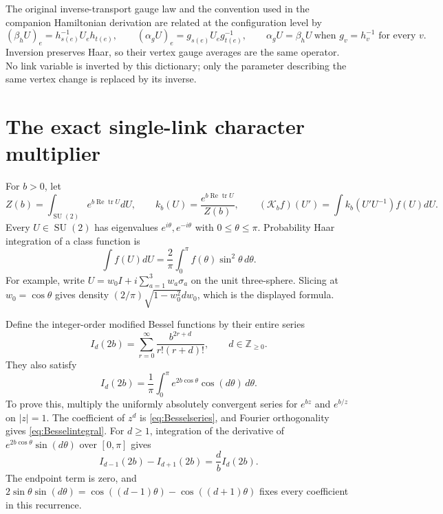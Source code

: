 \documentclass[11pt]{article}
\newcommand{\SU}{\operatorname{SU}}
\newcommand{\tr}{\operatorname{tr}}
\newcommand{\Rea}{\operatorname{Re}}
\begin{document}
The original inverse-transport gauge law and the convention used in the
companion Hamiltonian derivation are related at the configuration level by
\begin{equation}\label{eq:gaugedictionary}
 (\beta_hU)_e=h_{s(e)}^{-1}U_eh_{t(e)},\qquad
 (\alpha_gU)_e=g_{s(e)}U_eg_{t(e)}^{-1},\qquad
 \alpha_gU=\beta_hU\ \text{when }g_v=h_v^{-1}\text{ for every }v.
\end{equation}
Inversion preserves Haar, so their vertex gauge averages are the same
operator. No link variable is inverted by this dictionary; only the
parameter describing the same vertex change is replaced by its inverse.

\section{The exact single-link character multiplier}

For $b>0$, let
\begin{equation}\label{eq:kernel}
 Z(b)=\int_{\SU(2)}e^{b\Rea\tr U}dU,\qquad
 k_b(U)=\frac{e^{b\Rea\tr U}}{Z(b)},\qquad
 (\mathcal K_b f)(U')=\int k_b(U'U^{-1})f(U)dU.
\end{equation}
Every $U\in\SU(2)$ has eigenvalues $e^{i\theta},e^{-i\theta}$ with
$0\leq\theta\leq\pi$. Probability Haar integration of a class function is
\[
 \int f(U)dU=\frac2\pi\int_0^\pi f(\theta)\sin^2\theta\,d\theta.
\]
For example, write $U=w_0I+i\sum_{a=1}^3w_a\sigma_a$ on the unit
three-sphere. Slicing at $w_0=\cos\theta$ gives density
$(2/\pi)\sqrt{1-w_0^2}dw_0$, which is the displayed formula.

Define the integer-order modified Bessel functions by their entire series
\begin{equation}\label{eq:Besselseries}
 I_d(2b)=\sum_{r=0}^{\infty}\frac{b^{2r+d}}{r!(r+d)!},
 \qquad d\in\mathbb Z_{\geq0}.
\end{equation}
They also satisfy
\begin{equation}\label{eq:Besselintegral}
 I_d(2b)=\frac1\pi\int_0^\pi e^{2b\cos\theta}\cos(d\theta)\,d\theta.
\end{equation}
To prove this, multiply the uniformly absolutely convergent series for
$e^{bz}$ and $e^{b/z}$ on $|z|=1$. The coefficient of $z^d$ is
\eqref{eq:Besselseries}, and Fourier orthogonality gives
\eqref{eq:Besselintegral}. For $d\geq1$, integration of the derivative
of $e^{2b\cos\theta}\sin(d\theta)$ over $[0,\pi]$ gives
\begin{equation}\label{eq:recurrence}
 I_{d-1}(2b)-I_{d+1}(2b)=\frac db I_d(2b).
\end{equation}
The endpoint term is zero, and
$2\sin\theta\sin(d\theta)=\cos((d-1)\theta)-\cos((d+1)\theta)$
fixes every coefficient in this recurrence.
\end{document}
